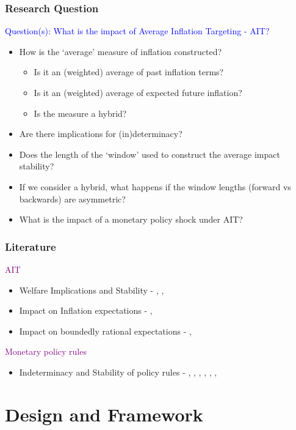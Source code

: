 \documentclass{beamer}
\begin{document}
\begin{frame}
	\frametitle{Research Question}
	\textcolor{blue}{Question(s): What is the impact of Average Inflation Targeting - AIT?}
	\begin{itemize}
		\item How is the `average' measure of inflation constructed?
		\begin{itemize}
			\item Is it an (weighted) average of past inflation terms?
			\item Is it an (weighted) average of expected future inflation?
			\item Is the measure a hybrid?
		\end{itemize}
		\item \setlength\itemsep{1em} Are there implications for (in)determinacy? 
		\item Does the length of the `window' used to construct the average impact stability?
		\item If we consider a hybrid, what happens if the window lengths (forward vs backwards) are asymmetric? 
		\item What is the impact of a monetary policy shock under AIT?
	\end{itemize}
\end{frame}

\begin{frame}
	\frametitle{Literature}
	\textcolor{purple}{AIT}
	\begin{itemize}
		\item Welfare Implications and Stability - \cite{budianto2020}, \cite{eo2020}, \cite{piergallini2022}
		\item Impact on Inflation expectations - \cite{coibion2020}, \cite{hoffmann2022}
		\item Impact on boundedly rational expectations - \cite{honka2021}, \cite{budianto2020}
	\end{itemize}
	\textcolor{purple}{Monetary policy rules}
	\begin{itemize}
		\item Indeterminacy and Stability of policy rules - \cite{clarida2000monetary}, \cite{lubik2004testing}, \cite{evans2005monetary}, \cite{nessen2005}, \cite{castelnuovo2015monetary}, \cite{mertens2019tying}, \cite{svensson2020monetary}
	\end{itemize}
\end{frame}

\section*{Design and Framework}
\end{document}

